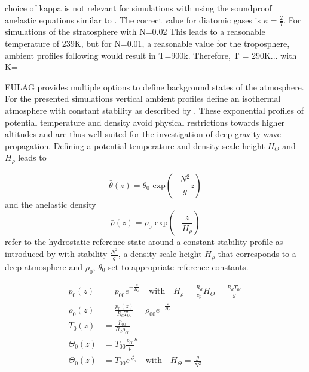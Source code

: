 choice of kappa is not relevant for simulations with using the soundproof anelastic equations similar to \textcite[]{lipps_scale_1982}. The correct value for diatomic gases is $\kappa=\frac{2}{7}$. For simulations of the stratosphere with N=0.02 This leads to a reasonable temperature of 239K, but for N=0.01, a reasonable value for the troposphere, ambient profiles following \textcite{bacmeister_breakdown_1989} would result in T=900k. Therefore, T = 290K... with K=


EULAG provides multiple options to define background states of the atmosphere. For the presented simulations vertical ambient profiles define an isothermal atmosphere with constant stability as described by \textcite{bacmeister_breakdown_1989}. These exponential profiles of potential temperature and density avoid physical restrictions towards higher altitudes and are thus well suited for the investigation of deep gravity wave propagation. Defining a potential temperature and density scale height $H_{\Theta}$ and $H_{\rho}$ leads to


\begin{equation}
    \bar{\theta}(z) = \theta_0 \textrm{ exp}(-\frac{N^2}{g} z) 
    \label{equ:thetaScale}
\end{equation}
%
and the anelastic density 
%
\begin{equation}
    \bar{\rho}(z) = \rho_0 \textrm{ exp}(-\frac{z}{H_{\rho}})
    \label{equ:densityScale}
\end{equation}
refer to the hydrostatic reference state around a constant stability profile as introduced by \textcite{bacmeister_breakdown_1989} with stability $\frac{N^2}{g}$, a density scale height $H_{\rho}$ that corresponds to a deep atmosphere and $\rho_0$, $\theta_0$ set to appropriate reference constants.

\begin{equation}
\begin{aligned}
    p_0(z) &= p_{00} e^{-\frac{z}{H_{\rho}}} \quad \textrm{with} \quad H_{\rho} = \frac{R_d}{c_p} H_{\Theta} = \frac{R_d T_{00}}{g} \\
    \rho_0(z) &= \frac{p_0(z)}{R_d T_{00}} = \rho_{00} e^{-\frac{z}{H_{\rho}}} \\
    T_0(z) &= \frac{p_{00}}{R_d \rho_{00}} \\
    \Theta_0(z) &= T_{00} \frac{p_{00}}{p}^{\kappa} \\
    \Theta_0(z) &= T_{00} e^{\frac{z}{H_{\Theta}}} \quad \textrm{with} \quad H_{\Theta} = \frac{g}{N^2} \\
    \label{equ:ambient-Profiles}
\end{aligned}
\end{equation}

